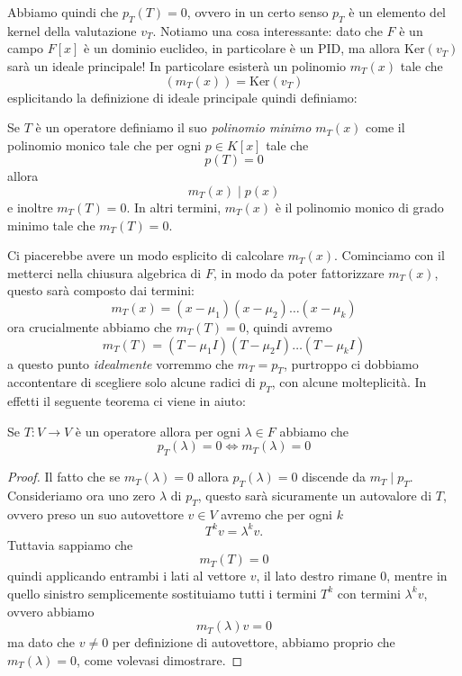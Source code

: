 \documentclass[11pt]{scrartcl}
\renewcommand{\ker}[1]{\text{Ker}\left(#1\right)}
\begin{document}
   	 Abbiamo quindi che $p_T(T)=0$, ovvero in un certo senso $p_T$ è un elemento del kernel della valutazione $v_T$. Notiamo una cosa interessante: dato che $F$ è un campo $F[x]$ è un dominio euclideo, in particolare è un PID, ma allora $\ker{v_T}$ sarà un ideale principale! In particolare esisterà un polinomio $m_T(x)$ tale che 
   	 $$\left(m_T(x)\right)=\ker{v_T}$$
   	 esplicitando la definizione di ideale principale quindi definiamo:
   	 \begin{definition}
   	 	Se $T$ è un operatore definiamo il suo \textit{polinomio minimo} $m_T(x)$ come il polinomio monico tale che per ogni $p\in K[x]$ tale che 
   	 	$$p(T)=0$$
   	 	allora
   	 	$$m_T(x)\mid p(x)$$
   	 	e inoltre $m_T(T)=0$.
   	 	In altri termini, $m_T(x)$ è il polinomio monico di grado minimo tale che $m_T(T)=0$.
   	 \end{definition}
   	 Ci piacerebbe avere un modo esplicito di calcolare $m_T(x)$. Cominciamo con il metterci nella chiusura algebrica di $F$, in modo da poter fattorizzare $m_T(x)$, questo sarà composto dai termini:
   	 $$m_T(x)=(x-\mu_1)(x-\mu_2)\dots(x-\mu_k)$$ 
   	 ora crucialmente abbiamo che $m_T(T)=0$, quindi avremo
   	 $$m_T(T)=\left(T-\mu_1I\right)\left(T-\mu_2I\right)\dots \left(T-\mu_kI\right)$$
   	 a questo punto \textit{idealmente} vorremmo che $m_T=p_T$, purtroppo ci dobbiamo accontentare di scegliere solo alcune radici di $p_T$, con alcune molteplicità. In effetti il seguente teorema ci viene in aiuto:
   	 \begin{theorem}
   	 	Se $T:V\to V$ è un operatore allora per ogni $\lambda\in F$ abbiamo che
   	 	$$p_T(\lambda)=0 \iff m_T(\lambda)=0$$
   	 \end{theorem}
   	 \begin{proof}
   	 	Il fatto che se $m_T(\lambda)=0$ allora $p_T(\lambda)=0$ discende da $m_T\mid p_T$. Consideriamo ora uno zero $\lambda$ di $p_T$, questo sarà sicuramente un autovalore di $T$, ovvero preso un suo autovettore $v\in V$ avremo che per ogni $k$
   	 	$$T^kv=\lambda^kv.$$
   	 	Tuttavia sappiamo che 
   	 	$$m_T(T)=0$$
   	 	quindi applicando entrambi i lati al vettore $v$, il lato destro rimane $0$, mentre in quello sinistro semplicemente sostituiamo tutti i termini $T^k$ con termini $\lambda^kv$, ovvero abbiamo
   	 	$$m_T(\lambda)v=0$$
   	 	ma dato che $v\ne 0$ per definizione di autovettore, abbiamo proprio che $m_T(\lambda)=0$, come volevasi dimostrare.
   	 \end{proof}
  
\end{document}
